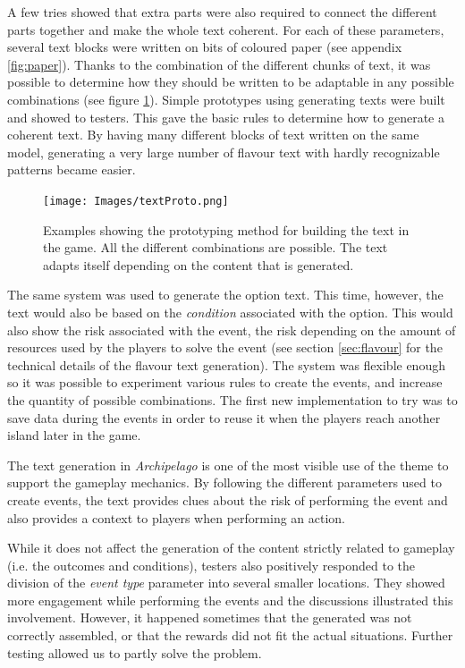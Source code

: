 A few tries showed that extra parts were also required to connect the different parts together and make the whole text coherent. For each of these parameters, several text blocks were written on bits of coloured paper (see appendix \ref{fig:paper}). Thanks to the combination of the different chunks of text, it was possible to determine how they should be written to be adaptable in any possible combinations (see figure \ref{fig:textproto}). Simple prototypes using generating texts were built and showed to testers. This gave the basic rules to determine how to generate a coherent text. By having many different blocks of text written on the same model, generating a very large number of flavour text with hardly recognizable patterns became easier. 

\begin{figure}[!ht]
    \centering
    \texttt{[image: Images/textProto.png]}
    \caption{Examples showing the prototyping method for building the text in the game. All the different combinations are possible. The text adapts itself depending on the content that is generated.}
    \label{fig:textproto}
\end{figure}

The same system was used to generate the option text. This time, however, the text would also be based on the \textit{condition} associated with the option. This would also show the risk associated with the event, the risk depending on the amount of resources used by the players to solve the event (see section \ref{sec:flavour} for the technical details of the flavour text generation). The system was flexible enough so it was possible to experiment various rules to create the events, and increase the quantity of possible combinations. The first new implementation to try was to save data during the events in order to reuse it when the players reach another island later in the game.

The text generation in \textit{Archipelago} is one of the most visible use of the theme to support the gameplay mechanics. By following the different parameters used to create events, the text provides clues about the risk of performing the event and also provides a context to players when performing an action.

While it does not affect the generation of the content strictly related to gameplay (i.e. the outcomes and conditions), testers also positively responded to the division of the \textit{event type} parameter into several smaller locations. They showed more engagement while performing the events and the discussions illustrated this involvement. However, it happened sometimes that the generated was not correctly assembled, or that the rewards did not fit the actual situations. Further testing allowed us to partly solve the problem.
